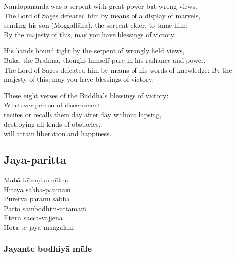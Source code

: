 Nandopananda was a serpent with great power but wrong views.\\
The Lord of Sages defeated him by means of a display of marvels,\\
sending his son (Moggallāna), the serpent-elder, to tame him:\\
By the majesty of this, may you have blessings of victory.

His hands bound tight by the serpent of wrongly held views,\\
Baka, the Brahmā, thought himself pure in his radiance and power.\\
The Lord of Sages defeated him by means of his words of knowledge:
By the majesty of this, may you have blessings of victory.

These eight verses of the Buddha's blessings of victory:\\
Whatever person of discernment\\
recites or recalls them day after day without lapsing,\\
destroying all kinds of obstacles,\\
will attain liberation and happiness.

\subsection{Jaya-paritta}
\label{maha-karuniko}


\begin{paritta}
  Mahā-kāruṇiko nātho\\
  Hitāya sabba-pāṇinaṁ\\
  Pūretvā pāramī sabbā\\
  Patto sambodhim-uttamaṁ\\
  Etena sacca-vajjena\\
  Hotu te jaya-maṅgalaṁ
\end{paritta}

\clearpage

\subsubsection{Jayanto bodhiyā mūle}



\bigskip

